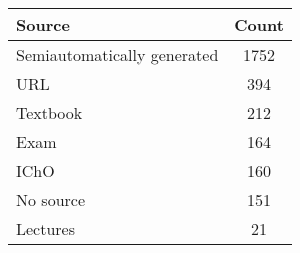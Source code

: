 \begin{tabular}{lc}
\toprule
Source & Count \\
\midrule
Semiautomatically generated & 1752 \\
URL & 394 \\
Textbook & 212 \\
Exam & 164 \\
IChO & 160 \\
No source & 151 \\
Lectures & 21 \\
\bottomrule
\end{tabular}

